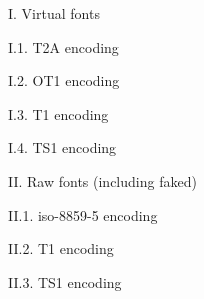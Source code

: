 \let\noinit!
\def\tst#1{\def\fontname{#1}\startfont\table\vfill\eject}

I. Virtual fonts

I.1. T2A encoding

\tst{tlir6a}
\tst{tliro6a}
\tst{tlirc6a}
\tst{tliri6a}
\tst{tliru6a}
\tst{tliric6a}
\tst{tlib6a}
\tst{tlibo6a}
\tst{tlibc6a}
\tst{tlibi6a}
\tst{tlibu6a}
\tst{tlibic6a}

I.2. OT1 encoding

\tst{tlir7t}
\tst{tliro7t}
\tst{tlirc7t}
\tst{tliri7t}
\tst{tliru7t}
\tst{tliric7t}
\tst{tlib7t}
\tst{tlibo7t}
\tst{tlibc7t}
\tst{tlibi7t}
\tst{tlibu7t}
\tst{tlibic7t}

I.3. T1 encoding

\tst{tlir8t}
\tst{tliro8t}
\tst{tlirc8t}
\tst{tliri8t}
\tst{tliru8t}
\tst{tliric8t}
\tst{tlib8t}
\tst{tlibo8t}
\tst{tlibc8t}
\tst{tlibi8t}
\tst{tlibu8t}
\tst{tlibic8t}

I.4. TS1 encoding

\tst{tlir8c}
\tst{tliro8c}
\tst{tliri8c}
\tst{tliru8c}
\tst{tlib8c}
\tst{tlibo8c}
\tst{tlibi8c}
\tst{tlibu8c}

II. Raw fonts (including faked)

II.1. iso-8859-5 encoding

\tst{rtlir6i}
\tst{rtliro6i}
\tst{rtliri6i}
\tst{rtliru6i}
\tst{rtlib6i}
\tst{rtlibo6i}
\tst{rtlibi6i}
\tst{rtlibu6i}

II.2. T1 encoding

\tst{rtlir8t}
\tst{rtliro8t}
\tst{rtliri8t}
\tst{rtliru8t}
\tst{rtlib8t}
\tst{rtlibo8t}
\tst{rtlibi8t}
\tst{rtlibu8t}

II.3. TS1 encoding

\tst{rtlir8c}
\tst{rtliro8c}
\tst{rtliri8c}
\tst{rtliru8c}
\tst{rtlib8c}
\tst{rtlibo8c}
\tst{rtlibi8c}
\tst{rtlibu8c}

\bye

